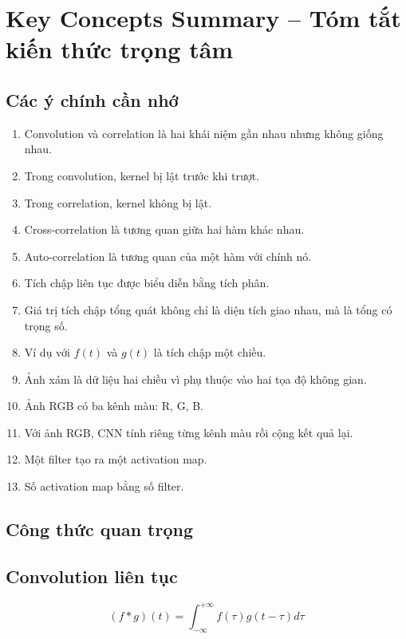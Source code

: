 \section{Key Concepts Summary -- Tóm tắt kiến thức trọng tâm}

\subsection{Các ý chính cần nhớ}

\begin{enumerate}
    \item Convolution và correlation là hai khái niệm gần nhau nhưng không giống nhau.
    \item Trong convolution, kernel bị lật trước khi trượt.
    \item Trong correlation, kernel không bị lật.
    \item Cross-correlation là tương quan giữa hai hàm khác nhau.
    \item Auto-correlation là tương quan của một hàm với chính nó.
    \item Tích chập liên tục được biểu diễn bằng tích phân.
    \item Giá trị tích chập tổng quát không chỉ là diện tích giao nhau, mà là tổng có trọng số.
    \item Ví dụ với $f(t)$ và $g(t)$ là tích chập một chiều.
    \item Ảnh xám là dữ liệu hai chiều vì phụ thuộc vào hai tọa độ không gian.
    \item Ảnh RGB có ba kênh màu: R, G, B.
    \item Với ảnh RGB, CNN tính riêng từng kênh màu rồi cộng kết quả lại.
    \item Một filter tạo ra một activation map.
    \item Số activation map bằng số filter.
\end{enumerate}

\subsection{Công thức quan trọng}

\subsection*{Convolution liên tục}

\[
    (f*g)(t)
    =
    \int_{-\infty}^{+\infty}
    f(\tau)g(t-\tau)d\tau
\]

